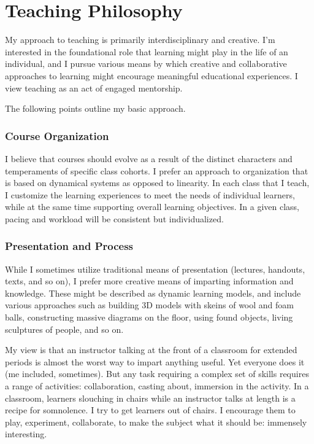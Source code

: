 \documentclass[10pt,DIV09,letterpaper,oneside,headsepline]{scrreprt}
\begin{document}
\chapter{Teaching Philosophy}

My approach to teaching is primarily interdisciplinary and creative. I'm interested in the foundational role that learning might play in the life of an individual, and I pursue various means by which creative and collaborative approaches to learning might encourage meaningful educational experiences. I view teaching as an act of engaged mentorship.

The following points outline my basic approach.

\subsection{Course Organization}
I believe that courses should evolve as a result of the distinct characters and temperaments of specific class cohorts. I prefer an approach to organization that is based on dynamical systems as opposed to linearity. In each class that I teach, I customize the learning experiences to meet the needs of individual learners, while at the same time supporting overall learning objectives. In a given class, pacing and workload will be consistent but individualized.

\subsection{Presentation and Process}

While I sometimes utilize traditional means of presentation (lectures, handouts, texts, and so on), I prefer more creative means of imparting information and knowledge. These might be described as dynamic learning models, and include various approaches such as building 3D models with skeins of wool and foam balls, constructing massive diagrams on the floor, using found objects, living sculptures of people, and so on.

My view is that an instructor talking at the front of a classroom for extended periods is almost the worst way to impart anything useful. Yet everyone does it (me included, sometimes). But any task requiring a complex set of skills requires a range of activities: collaboration, casting about, immersion in the activity. In a classroom, learners slouching in chairs while an instructor talks at length is a recipe for somnolence. I try to get learners out of chairs. I encourage them to play, experiment, collaborate, to make the subject what it should be: immensely interesting.
\end{document}
